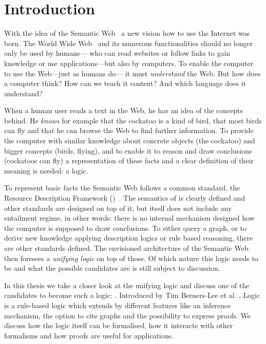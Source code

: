 \chapter{Introduction}
\setlength{\epigraphrule}{0pt}
\setlength{\epigraphwidth}{0.75\textwidth}

With the idea of the Semantic Web~\cite{SemanticWeb} a new vision how to use the Internet was born. The World Wide
Web~\cite{bernerslee_1992} and its numerous functionalities should no longer only be used by humans---%
who can read websites or follow links to gain knowledge or use applications---but also by computers. To enable the computer to use the Web---just as humans do---%
it must \emph{understand} the Web. But how does a computer think? How can we teach it content? 
And which language does it understand? 

When a human user reads a text in the Web, he has an idea of the concepts behind. He \emph{knows} for example that the cockatoo is a kind of bird, that most birds can fly 
and that he
can browse the Web to find further information. To provide the computer with similar knowledge about concrete objects (the cockatoo) and bigger concepts (birds, flying),
and to enable it to reason and draw conclusions (cockatoos can fly) a representation of these facts and a clear definition of their meaning is needed: a logic.

To represent basic facts the Semantic Web follows a common standard, the Resource Description Framework (\rdf)~\cite{rdf}. 
The semantics of \rdf is clearly defined and other standards are designed on top of it, 
but \rdf itself does not include any entailment regime, in other words: there is no internal
mechanism designed how the computer is supposed to draw conclusions.
To either query a graph, or to derive new knowledge applying description logics
or rule based reasoning, there are other standards defined. The envisioned architecture of the Semantic Web then 
foresees a \emph{unifying logic} on top of those. 
Of which nature this logic needs to be and what the possible candidates are is still subject to discussion. 

In this thesis we take a closer look at the unifying logic and 
discuss one of the candidates to become such a logic: 
\notationthree. 
Introduced by Tim Berners-Lee et al. \cite{N3Logic}, \notationthree Logic is a rule-based logic which extends \rdf
by different features like an inference mechanism, the option to cite graphs and the possibility to express proofs.
We discuss how the logic itself can be formalised, how it interacts with other formalisms and how proofs are useful for applications.

